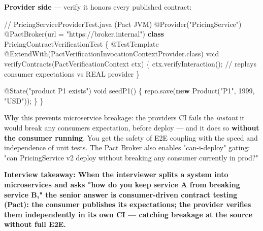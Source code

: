 \documentclass[11pt]{article}
\newenvironment{Shaded}{\begin{snugshade}}{\end{snugshade}}
\newcommand{\AttributeTok}[1]{\textcolor[rgb]{0.16,0.50,0.73}{#1}}
\newcommand{\CommentTok}[1]{\textcolor[rgb]{0.48,0.49,0.49}{#1}}
\newcommand{\DataTypeTok}[1]{\textcolor[rgb]{0.16,0.50,0.73}{#1}}
\newcommand{\DecValTok}[1]{\textcolor[rgb]{0.96,0.45,0.00}{#1}}
\newcommand{\FunctionTok}[1]{\textcolor[rgb]{0.56,0.27,0.68}{#1}}
\newcommand{\KeywordTok}[1]{\textcolor[rgb]{0.81,0.81,0.76}{\textbf{#1}}}
\newcommand{\NormalTok}[1]{\textcolor[rgb]{0.81,0.81,0.76}{#1}}
\newcommand{\OperatorTok}[1]{\textcolor[rgb]{0.81,0.81,0.76}{#1}}
\newcommand{\StringTok}[1]{\textcolor[rgb]{0.96,0.31,0.31}{#1}}
\begin{document}
\textbf{Provider side} --- verify it honors every published contract:


\begin{Shaded}
\begin{Highlighting}[]
\CommentTok{// PricingServiceProviderTest.java  (Pact JVM)}
\AttributeTok{@Provider}\OperatorTok{(}\StringTok{"PricingService"}\OperatorTok{)}
\AttributeTok{@PactBroker}\OperatorTok{(}\NormalTok{url }\OperatorTok{=} \StringTok{"https://broker.internal"}\OperatorTok{)}
\KeywordTok{class}\NormalTok{ PricingContractVerificationTest }\OperatorTok{\{}
    \AttributeTok{@TestTemplate}
    \AttributeTok{@ExtendWith}\OperatorTok{(}\NormalTok{PactVerificationInvocationContextProvider}\OperatorTok{.}\FunctionTok{class}\OperatorTok{)}
    \DataTypeTok{void} \FunctionTok{verifyContracts}\OperatorTok{(}\NormalTok{PactVerificationContext ctx}\OperatorTok{)} \OperatorTok{\{}
\NormalTok{        ctx}\OperatorTok{.}\FunctionTok{verifyInteraction}\OperatorTok{();}   \CommentTok{// replays consumer expectations vs REAL provider}
    \OperatorTok{\}}

    \AttributeTok{@State}\OperatorTok{(}\StringTok{"product P1 exists"}\OperatorTok{)}
    \DataTypeTok{void} \FunctionTok{seedP1}\OperatorTok{()} \OperatorTok{\{}\NormalTok{ repo}\OperatorTok{.}\FunctionTok{save}\OperatorTok{(}\KeywordTok{new} \FunctionTok{Product}\OperatorTok{(}\StringTok{"P1"}\OperatorTok{,} \DecValTok{1999}\OperatorTok{,} \StringTok{"USD"}\OperatorTok{));} \OperatorTok{\}}
\OperatorTok{\}}
\end{Highlighting}
\end{Shaded}

Why this prevents microservice breakage: the provider\textquotesingle s CI fails the \emph{instant} it would break any consumer\textquotesingle s expectation, before deploy --- and it does so \textbf{without the consumer running}. You get the safety of E2E coupling with the speed and independence of unit tests. The Pact Broker also enables "can-i-deploy" gating: "can PricingService v2 deploy without breaking any consumer currently in prod?"

\textbf{Interview takeaway: When the interviewer splits a system into microservices and asks "how do you keep service A from breaking service B," the senior answer is consumer-driven contract testing (Pact): the consumer publishes its expectations; the provider verifies them independently in its own CI --- catching breakage at the source without full E2E.}
\end{document}
